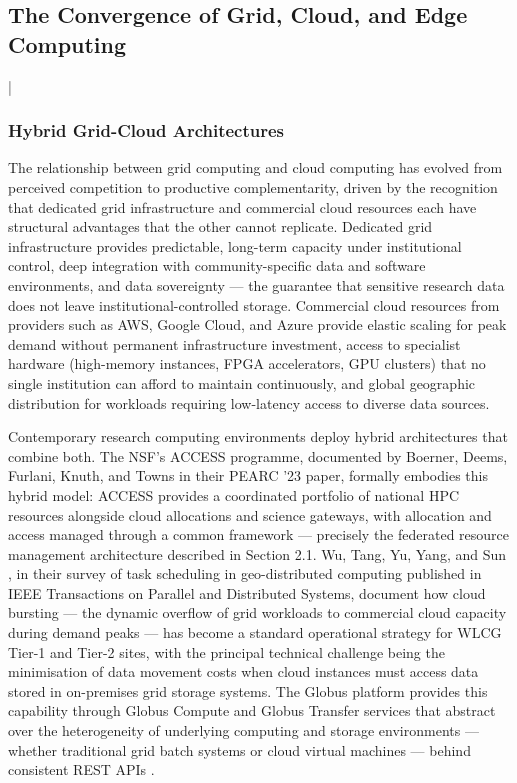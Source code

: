 \documentclass[12pt,a4paper]{report}
\begin{document}
\subsection{The Convergence of Grid, Cloud, and Edge Computing}
|\subsubsection{Hybrid Grid-Cloud Architectures}
The relationship between grid computing and cloud computing has evolved from perceived competition to productive complementarity, 
driven by the recognition that dedicated grid infrastructure and commercial cloud resources each have structural advantages that the other cannot 
replicate. Dedicated grid infrastructure provides predictable, long-term capacity under institutional control, deep integration with 
community-specific data and software environments, and data sovereignty — the guarantee that sensitive research data does not leave 
institutional-controlled storage. Commercial cloud resources from providers such as AWS, Google Cloud, and Azure provide elastic scaling for peak 
demand without permanent infrastructure investment, access to specialist hardware (high-memory instances, FPGA accelerators, GPU clusters) that no 
single institution can afford to maintain continuously, and global geographic distribution for workloads requiring low-latency access to diverse 
data sources. 

Contemporary research computing environments deploy hybrid architectures that combine both. The NSF’s ACCESS programme, documented
 by Boerner, Deems, Furlani, Knuth, and Towns \parencite{boerner2023access} in their PEARC ’23 paper, formally embodies this hybrid model: ACCESS provides a coordinated
  portfolio of national HPC resources alongside cloud allocations and science gateways, with allocation and access managed through a common 
  framework — precisely the federated resource management architecture described in Section 2.1. Wu, Tang, Yu, Yang, and Sun \parencite{wu2025task}, in their 
  survey of task scheduling in geo-distributed computing published in IEEE Transactions on Parallel and Distributed Systems, document how 
  cloud bursting — the dynamic overflow of grid workloads to commercial cloud capacity during demand peaks — has become a standard operational
   strategy for WLCG Tier-1 and Tier-2 sites, with the principal technical challenge being the minimisation of data movement costs when cloud
    instances must access data stored in on-premises grid storage systems. The Globus platform provides this capability through Globus Compute 
    and Globus Transfer services that abstract over the heterogeneity of underlying computing and storage environments — whether traditional
     grid batch systems or cloud virtual machines — behind consistent REST APIs \parencite{chard2023}.
\end{document}
